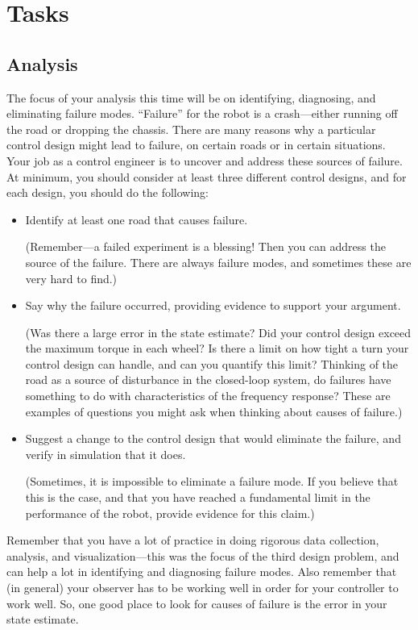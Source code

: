 \documentclass[12pt]{article}
\begin{document}
\section{Tasks}


\subsection{Analysis}
\label{secAnalysis}


The focus of your analysis this time will be on identifying, diagnosing, and eliminating failure modes. ``Failure'' for the robot is a crash---either running off the road or dropping the chassis. There are many reasons why a particular control design might lead to failure, on certain roads or in certain situations. Your job as a control engineer is to uncover and address these sources of failure. At minimum, you should consider at least three different control designs, and for each design, you should do the following:
\begin{itemize}
\item Identify at least one road that causes failure.

(Remember---a failed experiment is a blessing! Then you can address the source of the failure. There are always failure modes, and sometimes these are very hard to find.)

\item Say why the failure occurred, providing evidence to support your argument.

(Was there a large error in the state estimate? Did your control design exceed the maximum torque in each wheel? Is there a limit on how tight a turn your control design can handle, and can you quantify this limit? Thinking of the road as a source of disturbance in the closed-loop system, do failures have something to do with characteristics of the frequency response? These are examples of questions you might ask when thinking about causes of failure.)

\item Suggest a change to the control design that would eliminate the failure, and verify in simulation that it does.

(Sometimes, it is impossible to eliminate a failure mode. If you believe that this is the case, and that you have reached a fundamental limit in the performance of the robot, provide evidence for this claim.)

\end{itemize}
Remember that you have a lot of practice in doing rigorous data collection, analysis, and visualization---this was the focus of the third design problem, and can help a lot in identifying and diagnosing failure modes. Also remember that (in general) your observer has to be working well in order for your controller to work well. So, one good place to look for causes of failure is the error in your state estimate.
\end{document}
